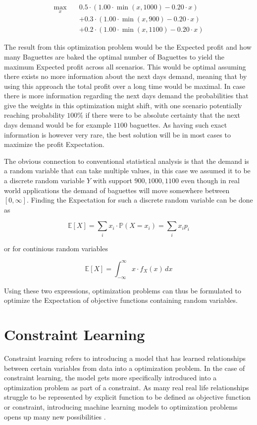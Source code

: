 \begin{align*}
	\max_{x} \quad & 0.5 \cdot \left(1.00 \cdot \min(x,1000) - 0.20 \cdot x \right) \\
	&+ 0.3 \cdot \left(1.00 \cdot \min(x,900) - 0.20 \cdot x\right) \\
	&+ 0.2 \cdot \left(1.00 \cdot \min(x,1100) - 0.20 \cdot x\right)
\end{align*}

The result from this optimization problem would be the Expected profit and how many Baguettes are baked the optimal number of Baguettes to yield the maximum Expected profit across all scenarios. This would be optimal assuming there exists no more information about the next days demand, meaning that by using this approach the total profit over a long time would be maximal. In case there is more information regarding the next days demand the probabilities that give the weights in this optimization might shift, with one scenario potentially reaching probability $100\%$ if there were to be absolute certainty that the next days demand would be for example $1100$ baguettes. As having such exact information is however very rare, the best solution will be in most cases to maximize the profit Expectation. 

The obvious connection to conventional statistical analysis is that the demand is a random variable that can take multiple values, in this case we assumed it to be a discrete random variable $Y$ with support ${900,1000,1100}$ even though in real world applications the demand of baguettes will move somewhere between $[0,\infty]$. Finding the Expectation for such a discrete random variable can be done as 

\[
\mathbb{E}[X] = \sum_{i} x_i \cdot \mathbb{P}(X = x_i) = \sum_{i} x_i p_i
\]

or for continious random variables  
 
\[
\mathbb{E}[X] = \int_{-\infty}^{\infty} x \cdot f_X(x) \, dx
\]

Using these two expressions, optimization problems can thus be formulated to optimize the Expectation of objective functions containing random variables. \cite{BirgeLouveauxStochasticProgramming}


\section{Constraint Learning} \label{sec:constraint_learning}

Constraint learning refers to introducing a model that has learned relationships between certain variables from data into a optimization problem. In the case of constraint learning, the model gets more specifically introduced into a optimization problem as part of a constraint. As many real real life relationships struggle to be represented by explicit function to be defined as objective function or constraint, introducing machine learning models to optimization problems opens up many new possibilities \cite{FAJEMISIN20241}.

